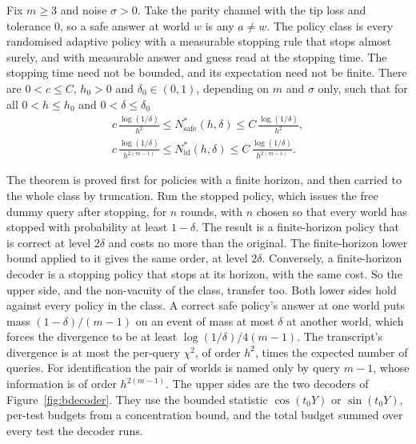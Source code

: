 \begin{theorem}
\label{thm:endpoint}
Fix $m\ge3$ and noise $\sigma>0$. Take the parity channel with the tip loss and tolerance
$0$, so a safe answer at world $w$ is any $a\ne w$. The policy class is every randomised
adaptive policy with a measurable stopping rule that stops almost surely, and with
measurable answer and guess read at the stopping time. The stopping time need not be
bounded, and its expectation need not be finite. There are
$0<c\le C$, $h_{0}>0$ and $\delta_{0}\in(0,1)$, depending on $m$ and $\sigma$ only, such that
for all $0<h\le h_{0}$ and $0<\delta\le\delta_{0}$
\begin{gather*}
c\,\frac{\log(1/\delta)}{h^{2}}\le N^{*}_{\mathrm{safe}}(h,\delta)\le C\,\frac{\log(1/\delta)}{h^{2}},\\
c\,\frac{\log(1/\delta)}{h^{2(m-1)}}\le N^{*}_{\mathrm{id}}(h,\delta)\le C\,\frac{\log(1/\delta)}{h^{2(m-1)}} .
\end{gather*}
\end{theorem}

The theorem is proved first for policies with a finite horizon, and then carried to the
whole class by truncation. Run the stopped policy, which issues the free dummy query after
stopping, for $n$ rounds, with $n$ chosen so that every world has stopped with probability at
least $1-\delta$. The result is a finite-horizon policy that is correct at level $2\delta$ and
costs no more than the original. The finite-horizon lower bound applied to it gives the same
order, at level $2\delta$. Conversely, a finite-horizon decoder is a stopping policy that
stops at its horizon, with the same cost. So the upper side, and the non-vacuity of the
class, transfer too. Both lower sides hold against every policy in the class. A correct safe policy's answer at
one world puts mass $(1-\delta)/(m-1)$ on an event of mass at most $\delta$ at another world,
which forces the divergence to be at least $\log(1/\delta)/4(m-1)$. The transcript's
divergence is at most the per-query $\chi^{2}$, of order $h^{2}$, times the expected number of
queries. For identification the pair of worlds is named only by query $m-1$, whose
information is of order $h^{2(m-1)}$. The upper sides are the two decoders of
Figure~\ref{fig:bdecoder}. They use the bounded statistic $\cos(t_{0}Y)$ or $\sin(t_{0}Y)$,
per-test budgets from a concentration bound, and the total budget summed over every test the
decoder runs.


